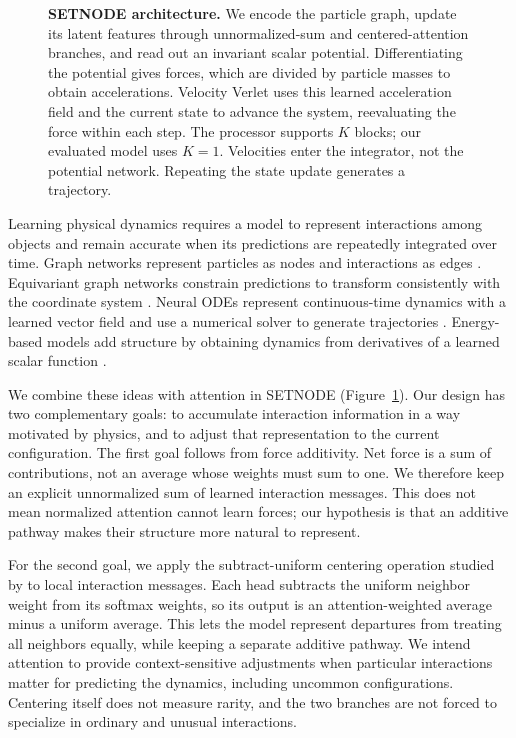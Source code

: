\documentclass[10pt,letterpaper,twocolumn]{article}
\numberwithin{equation}{section}
\begin{document}
\begin{figure}[t]
\centering
\resizebox{\textwidth}{!}{}
\caption{\textbf{SETNODE architecture.} We encode the particle graph, update its latent features
through unnormalized-sum and centered-attention branches, and read out an invariant scalar potential.
Differentiating the potential gives forces, which are divided by particle masses to obtain
accelerations. Velocity Verlet uses this learned acceleration field and the current state to advance
the system, reevaluating the force within each step. The processor supports $K$ blocks;
our evaluated model uses $K=1$. Velocities enter the integrator, not the potential network.
Repeating the state update generates a trajectory.}
\label{fig:architecture}
\end{figure}

Learning physical dynamics requires a model to represent interactions among objects and remain
accurate when its predictions are repeatedly integrated over time. Graph networks represent
particles as nodes and interactions as edges \citep{battaglia2018relational,sanchezgonzalez2020learning}.
Equivariant graph networks constrain predictions to transform consistently with the coordinate
system \citep{satorras2021en}. Neural ODEs represent continuous-time dynamics with a learned vector
field and use a numerical solver to generate trajectories \citep{chen2018neural}. Energy-based
models add structure by obtaining dynamics from derivatives of a learned scalar function
\citep{greydanus2019hamiltonian}.

We combine these ideas with attention \citep{vaswani2017attention,velickovic2018graph} in SETNODE
(Figure~\ref{fig:architecture}). Our design has two complementary goals: to accumulate interaction
information in a way motivated by physics, and to adjust that representation to the current
configuration. The first goal follows from force additivity. Net force is a sum of contributions,
not an average whose weights must sum to one. We therefore keep an explicit unnormalized sum of
learned interaction messages. This does not mean normalized attention cannot learn forces; our
hypothesis is that an additive pathway makes their structure more natural to represent.

For the second goal, we apply the subtract-uniform centering operation studied by
\citet{ali2023centered} to local interaction messages. Each head subtracts the uniform neighbor
weight from its softmax weights, so its output is an attention-weighted average minus a uniform
average. This lets the model represent departures from treating all neighbors equally, while keeping
a separate additive pathway. We intend attention to provide context-sensitive adjustments when
particular interactions matter for predicting the dynamics, including uncommon configurations.
Centering itself does not measure rarity, and the two branches are not forced to specialize in
ordinary and unusual interactions.
\end{document}
